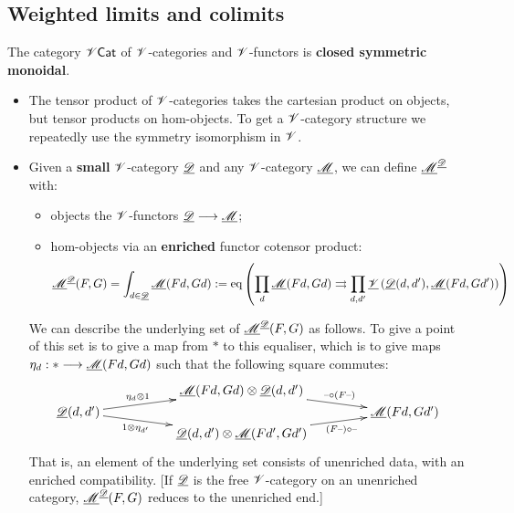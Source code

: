 \documentclass[11pt]{article}
\begin{document}
\begin{8. Weighted limits and colimits}
\subsection*{Weighted limits and colimits}
\begin{itemise}
\setlength{\parindent}{.25in}
\item The category $\mathscr{V}\mathsf{Cat}$ of $\mathscr{V}$-categories and $\mathscr{V}$-functors is \textbf{closed symmetric monoidal}.
\begin{itemize}\squishlist
\setlength{\parindent}{.25in}
\item The tensor product of $\mathscr{V}$-categories takes the cartesian product on objects, but tensor products on hom-objects. To get a $\mathscr{V}$-category structure we repeatedly use the symmetry isomorphism in $\mathscr{V}$.
\item Given a \textbf{small} $\mathscr{V}$-category $\underline{\mathscr{D}}$ and any $\mathscr{V}$-category $\underline{\mathscr{M}}$, we can define $\underline{\mathscr{M}}^{\underline{\mathscr{D}}}$ with:
\begin{itemize}\squishlist
\setlength{\parindent}{.25in}
\item objects the $\mathscr{V}$-functors $\underline{\mathscr{D}}\longrightarrow\underline{\mathscr{M}}$;
\item hom-objects via an \textbf{enriched} functor cotensor product:
\[\underline{\mathscr{M}}^{\underline{\mathscr{D}}}(F,G)=\int_{d\in\underline{\mathscr{D}}} \underline{\mathscr{M}}(Fd,Gd):=\textup{eq}\left(
\prod_{d}\underline{\mathscr{M}}(Fd,Gd)\rightrightarrows \prod_{d,d'}\underline{\mathscr{V}} \left(\underline{\mathscr{D}}(d,d'),\underline{\mathscr{M}}(Fd,Gd')\right)
\right)\]
\end{itemize}
We can describe the underlying set of ${\underline{\mathscr{M}}^{\underline{\mathscr{D}}}(F,G)}$ as follows. To give a point of this set is to give a map from $*$ to this equaliser, which is to give maps $\eta_d:*\longrightarrow\underline{\mathscr{M}}(Fd,Gd)$ such that the following square commutes:
\[\vcenter{\xymatrix@R=6mm@C=45mm@!0{
&%
\underline{\scrm}(Fd,Gd)\otimes \underline{\scrd}(d,d')\ar[dr]^-{\DASH \circ (F\DASH)}
&%
\\%
\underline{\scrd}(d,d')
\ar[ur]^-{\eta_d\otimes 1}
\ar[dr]_-{1\otimes \eta_{d'}}
&%
&%
\underline{\scrm}(Fd,Gd')\\%
&%
\underline{\scrd}(d,d')\otimes \underline{\scrm}(Fd',Gd') \ar[uudr]_-{(F\DASH) \circ \DASH }&%
}}\]
That is, an element of the underlying set consists of unenriched data, with an enriched compatibility.  [If $\underline{\mathscr{D}}$ is the free $\mathscr{V}$-category on an unenriched category, $\underline{\mathscr{M}}^{\underline{\mathscr{D}}}(F,G)$ reduces to the unenriched end.]


\end{itemize}
\end{itemise}
\end{8. Weighted limits and colimits}
\end{document}
